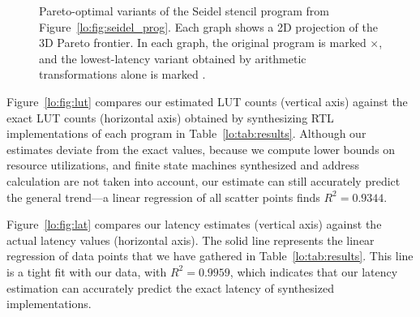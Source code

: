 \begin{figure*}[t]
    \caption{%
        Pareto-optimal variants of the Seidel stencil program from
        Figure~\ref{lo:fig:seidel_prog}. Each graph shows a 2D projection
        of the 3D Pareto frontier. In each graph, the original program is
        marked $\times$, and the lowest-latency variant obtained by arithmetic
        transformations alone is marked \protect\redcircle.}
    \label{lo:fig:seidel}
\end{figure*}

Figure~\ref{lo:fig:lut} compares our estimated LUT counts (vertical axis)
against the exact LUT counts (horizontal axis) obtained by synthesizing RTL
implementations of each program in Table~\ref{lo:tab:results}.  Although our
estimates deviate from the exact values, because we compute lower bounds on
resource utilizations, and finite state machines synthesized and address
calculation are not taken into account, our estimate can still accurately
predict the general trend---a linear regression of all scatter points finds
$R^2 = 0.9344$.

Figure~\ref{lo:fig:lat} compares our latency estimates (vertical axis)
against the actual latency values (horizontal axis). The solid line
represents the linear regression of data points that we have gathered in
Table~\ref{lo:tab:results}. This line is a tight fit with our data, with $R^2 =
0.9959$, which indicates that our latency estimation can accurately predict the
exact latency of synthesized implementations.

